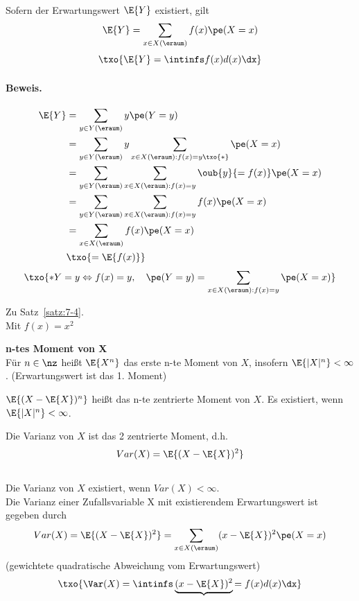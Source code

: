 \begin{satz}
    \label{satz:7-4}  \\
    Sofern der Erwartungswert $\E{Y}$ existiert, gilt
    \[
        \E{Y} = \sum_{x \in X(\eraum)} f(x) \pe(X=x)
    \]
    \[
        \txo{
            \E{Y} = \intinfs f(x) d(x) \dx
        }
    \]

    \paragraph{Beweis.}
    \begin{align*}
        \E{Y} & =   \sum_{y \in Y(\eraum)} y \pe(Y=y) \\
        & =   \sum_{y \in Y(\eraum)} y  \sum_{x \in X(\eraum): f(x) = y\txo{*}} \pe(X=x) \\
        & =   \sum_{y \in Y(\eraum)}   \sum_{x \in X(\eraum): f(x) = y} \oub{y}{=f(x)} \pe(X=x) \\
        & =\sum_{y \in Y(\eraum)}   \sum_{x \in X(\eraum): f(x) = y} f(x) \pe(X=x) \\
        & = \sum_{x \in X(\eraum)} f(x) \pe(X=x) \\
        & \txo{= \E{f(x)}}
    \end{align*}
    \[
        \txo{*  Y=y \Leftrightarrow f(x) = y, \quad \pe(Y=y) = \sum_{x \in X(\eraum): f(x) = y} \pe(X=x)}
    \]
\end{satz}

\begin{bsp}
    Zu Satz~\ref{satz:7-4}. \\
    Mit $f(x) = x^2$
\end{bsp}

\begin{defi}
    \textbf{n-tes Moment von X}   \\
    Für $n \in \nz $ heißt $\E{X^n}$ das erste n-te Moment von $X$, insofern $\E{|X|^n} < \infty$.
    (Erwartungswert ist das 1.
    Moment)
\end{defi}
\begin{defi} 
$\E{ ( X -  \E{X} )^n } $ heißt das n-te zentrierte Moment von $X$.
    Es existiert, wenn $\E{|X|^n} < \infty$. \\
\end{defi}
\begin{defi} 
Die Varianz von $X$ ist das 2 zentrierte Moment, d.h.
    \[
        Var(X) = \E{ ( X -  \E{X} )^2 }
    \]
     \\
    Die Varianz von $X$ existiert, wenn $Var(X) < \infty$. \\
    Die Varianz einer Zufallsvariable X mit existierendem Erwartungswert ist gegeben
    durch
    \[
        Var(X) = \E{ ( X -  \E{X} )^2 } = \sum_{x\in X(\eraum)} (x - \E{X})^2 \pe(X=x)
    \]
    (gewichtete quadratische Abweichung vom Erwartungswert)
    \[
        \txo{\Var(X) = \intinfs \underbrace{ (x - \E{X})^2 }{=f(x)} d(x) \dx }
    \]
\end{defi}

